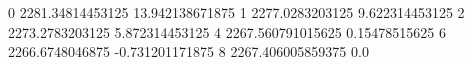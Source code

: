 0 2281.34814453125 13.942138671875
1 2277.0283203125 9.622314453125
2 2273.2783203125 5.872314453125
4 2267.560791015625 0.15478515625
6 2266.6748046875 -0.731201171875
8 2267.406005859375 0.0
